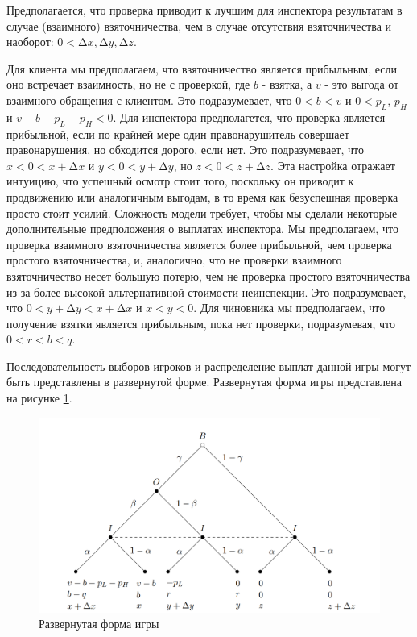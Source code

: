 \par
Предполагается, что проверка приводит к лучшим для инспектора результатам в случае (взаимного) взяточничества, чем в случае отсутствия взяточничества и наоборот: $0 <∆x, ∆y, ∆z$.
\par
Для клиента мы предполагаем, что взяточничество является прибыльным, если оно встречает взаимность, но не с проверкой, где $b$ - взятка, а $v$ - это выгода от взаимного обращения с клиентом. Это подразумевает, что $0 < b < v$ и $0 < p_L$, $p_H$ и $v - b - p_L - p_H <0$.
Для инспектора предполагется, что проверка является прибыльной, если по крайней мере один правонарушитель совершает правонарушения, но обходится дорого, если нет. Это подразумевает, что $x <0 <x + ∆x$ и $y <0 <y + ∆y$, но $z <0 <z + ∆z$. Эта настройка отражает интуицию, что успешный осмотр стоит того, поскольку он приводит к продвижению или аналогичным выгодам, в то время как безуспешная проверка просто стоит усилий. Сложность модели требует, чтобы мы сделали некоторые дополнительные предположения о выплатах инспектора. Мы предполагаем, что проверка взаимного взяточничества является более прибыльной, чем проверка простого взяточничества, и, аналогично, что не проверки взаимного взяточничество несет большую потерю, чем не проверка простого взяточничества из-за более высокой альтернативной стоимости неинспекции. Это подразумевает, что $0 <y + ∆y <x + ∆x$ и $x < y < 0$. Для чиновника мы предполагаем, что получение взятки является прибыльным, пока нет проверки, подразумевая, что $0 < r < b < q$.
\par
Последовательность выборов игроков и распределение выплат данной игры могут быть представлены в развернутой форме. Развернутая форма игры представлена на рисунке \ref{fig:figef1}.
\begin{figure}[H]
	\centering
	\includegraphics[width=0.9\linewidth]{inc/img/ef1}
	\caption{Развернутая форма игры}
	\label{fig:figef1}
\end{figure}
